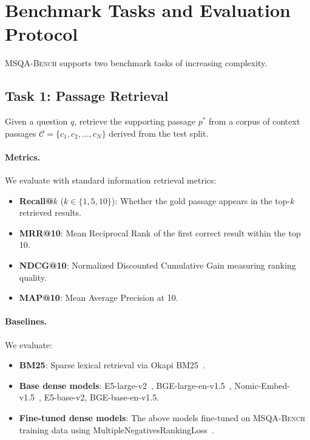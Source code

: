 \documentclass[11pt]{article}
\newcommand{\msqa}{\textsc{MSQA-Bench}}
\begin{document}
\section{Benchmark Tasks and Evaluation Protocol}
\label{sec:benchmark}

\msqa{} supports two benchmark tasks of increasing complexity.

\subsection{Task 1: Passage Retrieval}
\label{sec:task_retrieval}

Given a question $q$, retrieve the supporting passage $p^*$ from a corpus of context passages $\mathcal{C} = \{c_1, c_2, \ldots, c_N\}$ derived from the test split.

\paragraph{Metrics.} We evaluate with standard information retrieval metrics:
\begin{itemize}[leftmargin=*,itemsep=1pt]
    \item \textbf{Recall@$k$} ($k \in \{1, 5, 10\}$): Whether the gold passage appears in the top-$k$ retrieved results.
    \item \textbf{MRR@10}: Mean Reciprocal Rank of the first correct result within the top 10.
    \item \textbf{NDCG@10}: Normalized Discounted Cumulative Gain measuring ranking quality.
    \item \textbf{MAP@10}: Mean Average Precision at 10.
\end{itemize}

\paragraph{Baselines.} We evaluate:
\begin{itemize}[leftmargin=*,itemsep=1pt]
    \item \textbf{BM25}: Sparse lexical retrieval via Okapi BM25~\citep{robertson2009probabilistic}.
    \item \textbf{Base dense models}: E5-large-v2~\citep{wang2022text}, BGE-large-en-v1.5~\citep{xiao2023c}, Nomic-Embed-v1.5~\citep{nussbaum2024nomic}, E5-base-v2, BGE-base-en-v1.5.
    \item \textbf{Fine-tuned dense models}: The above models fine-tuned on \msqa{} training data using MultipleNegativesRankingLoss~\citep{henderson2017efficient}.
\end{itemize}
\end{document}

